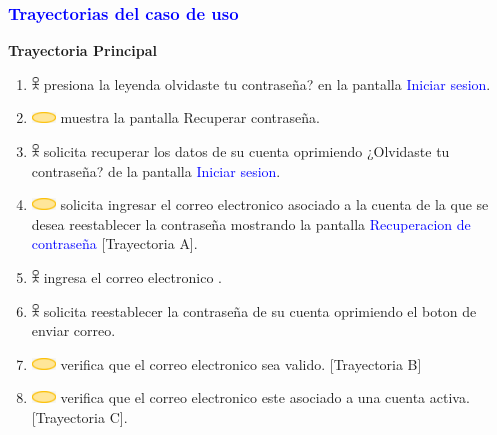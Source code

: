 \pagebreak
\subsubsection{\textcolor{blue}{Trayectorias del caso de uso}}
\textbf{Trayectoria Principal}
    \begin{enumerate}
    \item \includegraphics[width=0.0150\textwidth]{Figuras/persona.png} presiona la leyenda olvidaste tu contraseña? en la pantalla \textcolor{blue}{Iniciar sesion}.
    \item \includegraphics[width=0.0500\textwidth]{Figuras/sistema.png} muestra la pantalla Recuperar contraseña.
    \item \includegraphics[width=0.0150\textwidth]{Figuras/persona.png} solicita recuperar los datos de su cuenta oprimiendo ¿Olvidaste tu contraseña? de la pantalla \textcolor{blue}{Iniciar sesion}.
     \item \includegraphics[width=0.0500\textwidth]{Figuras/sistema.png} solicita ingresar el correo electronico asociado a la cuenta de la que se desea reestablecer la contraseña mostrando la pantalla \textcolor{blue}{Recuperacion de contraseña} [Trayectoria A].
    \item \includegraphics[width=0.0150\textwidth]{Figuras/persona.png} ingresa el correo electronico .
    \item \includegraphics[width=0.0150\textwidth]{Figuras/persona.png} solicita reestablecer la contraseña de su cuenta oprimiendo el boton de enviar correo.
    \item \includegraphics[width=0.0500\textwidth]{Figuras/sistema.png} verifica que el correo electronico sea valido. [Trayectoria B]
    \item \includegraphics[width=0.0500\textwidth]{Figuras/sistema.png} verifica que el correo electronico este asociado a una cuenta activa. [Trayectoria C].

\end{enumerate}
